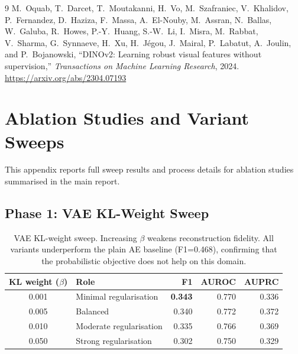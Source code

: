 \documentclass[11pt]{article}
\begin{document}
\begin{thebibliography}{9}
M.~Oquab, T.~Darcet, T.~Moutakanni, H.~Vo, M.~Szafraniec, V.~Khalidov, P.~Fernandez,
D.~Haziza, F.~Massa, A.~El-Nouby, M.~Assran, N.~Ballas, W.~Galuba, R.~Howes,
P.-Y.~Huang, S.-W.~Li, I.~Misra, M.~Rabbat, V.~Sharma, G.~Synnaeve, H.~Xu,
H.~J\'{e}gou, J.~Mairal, P.~Labatut, A.~Joulin, and P.~Bojanowski,
\newblock ``DINOv2: Learning robust visual features without supervision,''
\newblock \textit{Transactions on Machine Learning Research}, 2024.
\newblock \url{https://arxiv.org/abs/2304.07193}

\end{thebibliography}

\newpage
\section{Ablation Studies and Variant Sweeps}
\label{app:ablations}

This appendix reports full sweep results and process details for ablation studies summarised in the main report.

\subsection{Phase 1: VAE KL-Weight Sweep}
\label{app:vae_sweep}

\begin{table}[H]
\centering
\small
\begin{tabularx}{\linewidth}{c X r r r}
\toprule
\textbf{KL weight} ($\beta$) & \textbf{Role} & \textbf{F1} & \textbf{AUROC} & \textbf{AUPRC} \\
\midrule
0.001 & Minimal regularisation  & \textbf{0.343} & 0.770 & 0.336 \\
0.005 & Balanced                & 0.340          & 0.772 & 0.372 \\
0.010 & Moderate regularisation & 0.335          & 0.766 & 0.369 \\
0.050 & Strong regularisation   & 0.302          & 0.750 & 0.329 \\
\bottomrule
\end{tabularx}
\caption{VAE KL-weight sweep. Increasing $\beta$ weakens reconstruction fidelity. All variants underperform the plain AE baseline (F1=0.468), confirming that the probabilistic objective does not help on this domain.}
\label{tab:vae_beta_sweep}
\end{table}

\end{document}
